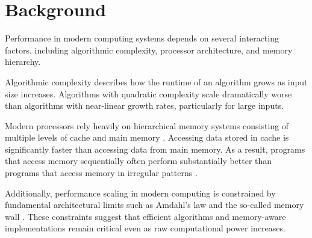 \section{Background}

Performance in modern computing systems depends on several interacting factors, including algorithmic complexity, processor architecture, and memory hierarchy.

Algorithmic complexity describes how the runtime of an algorithm grows as input size increases. Algorithms with quadratic complexity scale dramatically worse than algorithms with near-linear growth rates, particularly for large inputs.

Modern processors rely heavily on hierarchical memory systems consisting of multiple levels of cache and main memory \cite{lam1991}. Accessing data stored in cache is significantly faster than accessing data from main memory. As a result, programs that access memory sequentially often perform substantially better than programs that access memory in irregular patterns \cite{mckee2004}.

Additionally, performance scaling in modern computing is constrained by fundamental architectural limits such as Amdahl's law and the so-called memory wall \cite{hill2008, wulf1995}. These constraints suggest that efficient algorithms and memory-aware implementations remain critical even as raw computational power increases.
